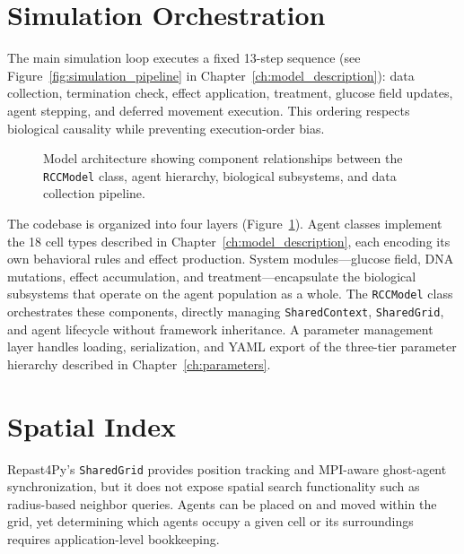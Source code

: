 \section{Simulation Orchestration}
\label{sec:simulation-orchestration}

The main simulation loop executes a fixed 13-step sequence (see Figure~\ref{fig:simulation_pipeline} in Chapter~\ref{ch:model_description}): data collection, termination check, effect application, treatment, glucose field updates, agent stepping, and deferred movement execution.  This ordering respects biological causality while preventing execution-order bias.

\begin{figure}[htbp]
\centering
{}
\caption{Model architecture showing component relationships between the \texttt{RCCModel} class, agent hierarchy, biological subsystems, and data collection pipeline.}
\label{fig:model_architecture}
\end{figure}

The codebase is organized into four layers (Figure~\ref{fig:model_architecture}).  Agent classes implement the 18 cell types described in Chapter~\ref{ch:model_description}, each encoding its own behavioral rules and effect production.  System modules---glucose field, DNA mutations, effect accumulation, and treatment---encapsulate the biological subsystems that operate on the agent population as a whole.  The \texttt{RCCModel} class orchestrates these components, directly managing \texttt{SharedContext}, \texttt{SharedGrid}, and agent lifecycle without framework inheritance.  A parameter management layer handles loading, serialization, and YAML export of the three-tier parameter hierarchy described in Chapter~\ref{ch:parameters}.

\section{Spatial Index}
\label{sec:spatial-index}

Repast4Py's \texttt{SharedGrid} provides position tracking and MPI-aware ghost-agent synchronization, but it does not expose spatial search functionality such as radius-based neighbor queries.  Agents can be placed on and moved within the grid, yet determining which agents occupy a given cell or its surroundings requires application-level bookkeeping.

